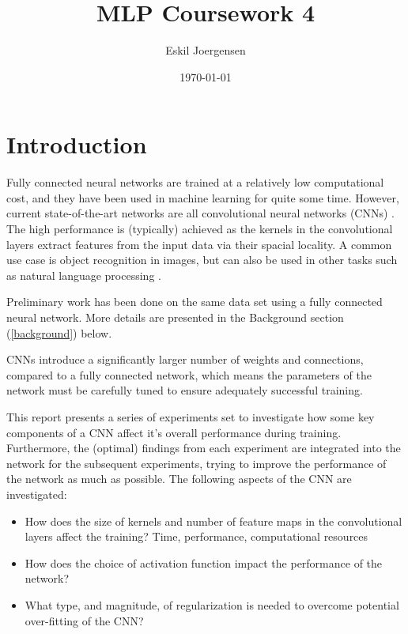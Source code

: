 \documentclass[]{article}
\title{MLP Coursework 4}
\author{Eskil Joergensen}
\date{\today}
\begin{document}
\maketitle

\section{Introduction}

Fully connected neural networks are trained at a relatively low computational cost, and they have been used in machine learning for quite some time. However, current state-of-the-art networks are all convolutional neural networks (CNNs) \cite{long2015fully}. The high performance is (typically) achieved as the kernels in the convolutional layers extract features from the input data via their spacial locality. A common use case is object recognition in images, but can also be used in other tasks such as natural language processing \cite{Collobert}. 

Preliminary work has been done on the same data set using a fully connected neural network. More details are presented in the Background section (\ref{background}) below. 

CNNs introduce a significantly larger number of weights and connections, compared to a fully connected network, which means the parameters of the network must be carefully tuned to ensure adequately successful training. 

This report presents a series of experiments set to investigate how some key components of a CNN affect it's overall performance during training. Furthermore, the (optimal) findings from each experiment are integrated into the network for the subsequent experiments, trying to improve the performance of the network as much as possible. The following aspects of the CNN are investigated:

\begin{itemize}
	
	\item How does the size of kernels and number of feature maps in the convolutional layers affect the training? Time, performance, computational resources
	
	\item How does the choice of activation function impact the performance of the network?
	
	\item What type, and magnitude, of regularization is needed to overcome potential over-fitting of the CNN?
	
\end{itemize}
\end{document}
